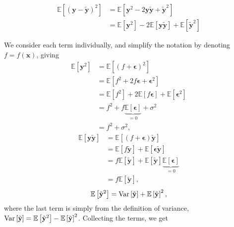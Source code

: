\documentclass[12pt]{article}
\begin{document}
\begin{align}
    \mathbb{E} \left[ \left( \mathbf{y} - \mathbf{\tilde{y}} \right)^2 \right] 
    &= \mathbb{E} \left[\mathbf{y}^2 - 2\mathbf{y}\mathbf{\tilde{y}} + \mathbf{\tilde{y}}^2 \right] \nonumber \\
    &= \mathbb{E} \left[\mathbf{y}^2\right] - 2\mathbb{E}\left[\mathbf{y}\mathbf{\tilde{y}}\right] + \mathbb{E} \left[ \mathbf{\tilde{y}}^2 \right]
\end{align}

We consider each term individually, and simplify the notation by denoting $f = f\left(\boldsymbol{x}\right)$, giving
\begin{align}
    \mathbb{E} \left[\mathbf{y}^2\right] &= \mathbb{E} \left[ \left(f + \boldsymbol{\epsilon}\right)^2 \right] \nonumber \\
    &= \mathbb{E} \left[f^2 +2f\boldsymbol{\epsilon} + \boldsymbol{\epsilon}^2 \right] \nonumber \\
    &= \mathbb{E} \left[f^2\right] + 2\mathbb{E} \left[f\boldsymbol{\epsilon}\right] + \mathbb{E} \left[\boldsymbol{\epsilon}^2 \right]\nonumber \\
    &= f^2 + f  \underbrace{\mathbb{E} \left[\boldsymbol{\epsilon} \right]}_{=0} + \sigma^2 \nonumber \\
    &= f^2 + \sigma^2,
\end{align}
\begin{align}
    \mathbb{E}\left[\mathbf{y}\mathbf{\tilde{y}}\right] &= \mathbb{E} \left[ \left(f + \boldsymbol{\epsilon}\right)\mathbf{\tilde{y}} \right] \nonumber \\
    &= \mathbb{E} \left[ f \mathbf{\tilde{y}} \right] + \mathbb{E} \left[ \boldsymbol{\epsilon} \mathbf{\tilde{y}} \right] \nonumber \\
    &= f\mathbb{E} \left[ \mathbf{\tilde{y}} \right] + \mathbb{E} \left[\mathbf{\tilde{y}}\right] \underbrace{\mathbb{E} \left[\boldsymbol{\epsilon}\right]}_{=0} \nonumber \\
    &= f\mathbb{E} \left[ \mathbf{\tilde{y}} \right],
\end{align}
\begin{align}
    \mathbb{E} \left[\tilde{\mathbf{y}}^2\right] = \rm Var\left[\tilde{\mathbf{y}} \right] + \mathbb{E} \left[\tilde{\mathbf{y}}\right] ^2,
\end{align}
where the last term is simply from the definition of variance, $\rm Var\left[\tilde{\mathbf{y}} \right] = \mathbb{E} \left[\tilde{\mathbf{y}}^2\right] - \mathbb{E} \left[\tilde{\mathbf{y}}\right] ^2$. Collecting the terms, we get
\end{document}

